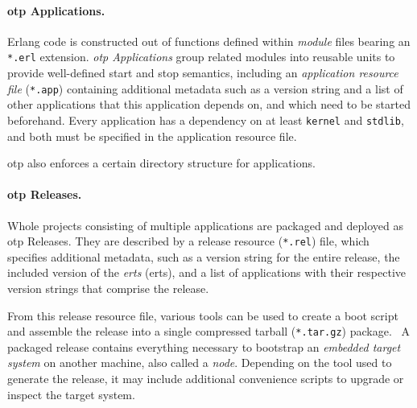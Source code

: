 \paragraph{\acrshort{otp} Applications.}
Erlang code is constructed out of functions defined within \mbox{\emph{module}} files bearing an \lstinline|*.erl| extension. \emph{\acrshort{otp} Applications} group related modules into reusable units to provide well-defined start and stop semantics, including an \emph{application resource file} (\lstinline|*.app|) containing additional metadata such as a version string and a list of other applications that this application depends on, and which need to be started beforehand. Every application has a dependency on at least \lstinline|kernel| and \lstinline|stdlib|, and both must be specified in the application resource file.~\cite{doc:otp}

\acrshort{otp} also enforces a certain directory structure for applications.~\cite{logan:otp}

\paragraph{\acrshort{otp} Releases.} Whole projects consisting of multiple applications are packaged and deployed as \acrshort{otp} Releases. They are described by a release resource (\lstinline|*.rel|) file, which specifies additional metadata, such as a version string for the entire release, the included version of the \emph{\acrlong{erts}} (\acrshort{erts}), and a list of applications with their respective version strings that comprise the release.

From this release resource file, various tools can be used to create a boot script and assemble the release into a single compressed tarball (\lstinline|*.tar.gz|) package.~\cite{doc:otp} A packaged release contains everything necessary to bootstrap an \emph{embedded target system} on another machine, also called a \emph{node}. Depending on the tool used to generate the release, it may include additional convenience scripts to upgrade or inspect the target system.

